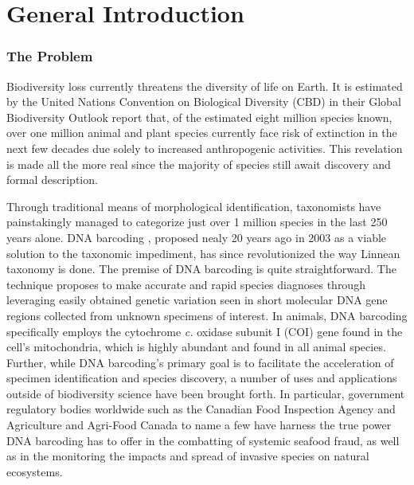 \linespread{1.0}

\chapter{General Introduction}

\subsection{The Problem}

Biodiversity loss currently threatens the diversity of life on Earth. It is estimated by the United Nations Convention on Biological Diversity (CBD) in their Global Biodiversity Outlook report that, of the estimated eight million species known, over one million animal and plant species currently face risk of extinction in the next few decades due solely to increased anthropogenic activities. This revelation is made all the more real since the majority of species still await discovery and formal description. 

\vspace{5mm}

Through traditional means of morphological identification, taxonomists have \\ painstakingly managed to categorize just over 1 million species in the last 250 years alone. DNA barcoding \cite{hebert2003biological, hebert2003barcoding}, proposed nealy 20 years ago in 2003 as a viable solution to the taxonomic impediment, has since revolutionized the way Linnean taxonomy is done. The premise of DNA barcoding is quite straightforward. The technique proposes to make accurate and rapid species diagnoses through leveraging easily obtained genetic variation seen in short molecular DNA gene regions collected from unknown specimens of interest. In animals, DNA barcoding specifically employs the cytochrome \textit{c.} oxidase subunit I (COI) gene found in the cell's mitochondria, which is highly abundant and found in all animal species. Further, while DNA barcoding's primary goal is to facilitate the acceleration of specimen identification and species discovery, a number of uses and applications outside of biodiversity science have been brought forth. In particular, government regulatory bodies worldwide such as the Canadian Food Inspection Agency and Agriculture and Agri-Food Canada to name a few have harness the true power DNA barcoding has to offer in the combatting of systemic seafood fraud, as well as in the monitoring the impacts and spread of invasive species on natural ecosystems.

